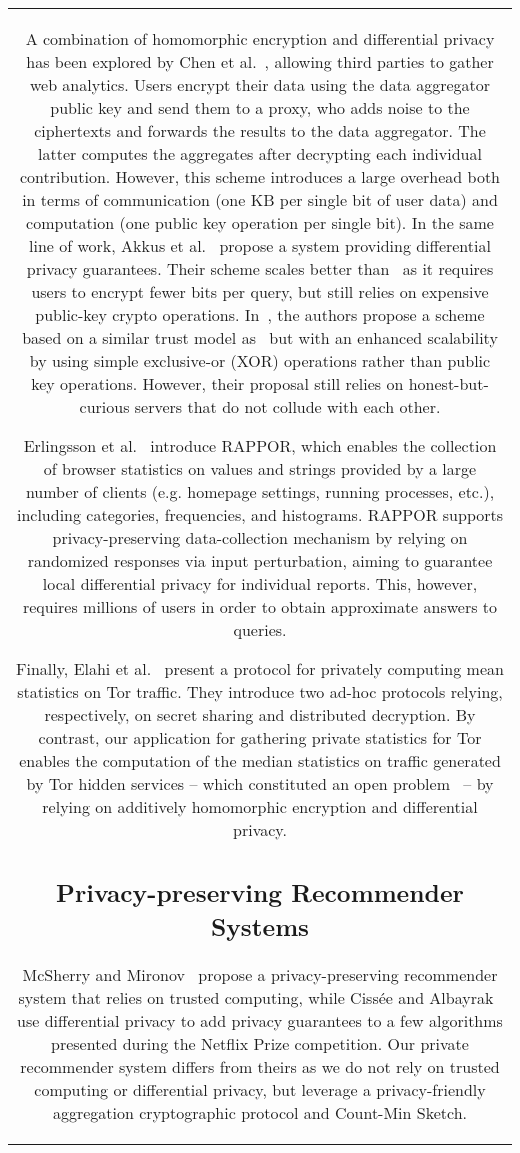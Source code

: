 \documentclass[conference]{IEEEtran}
\begin{document}
\begin{figure*}[ht!]
{\begin{tabular}{|c|}
A combination of homomorphic encryption and differential privacy has  been explored by Chen et al.~\cite{chen2012towards}, allowing third parties to gather web analytics.
Users encrypt their data using the data aggregator public key and send them to a proxy, who adds noise to the ciphertexts and forwards the results to the data aggregator. The latter computes the aggregates after decrypting each individual contribution.
However, this scheme introduces a large overhead both in terms of communication (one KB per single bit of user data) and computation (one public key operation per single bit).
In the same line of work, Akkus et al.~\cite{akkus2012non} propose a system providing differential privacy guarantees. 
Their scheme scales better than~\cite{chen2012towards} as it requires users to encrypt fewer bits per query, but still relies on expensive public-key crypto operations.
In~\cite{chen2013splitx}, the authors propose a scheme based on a similar trust model as~\cite{chen2012towards} but with an enhanced scalability by using simple exclusive-or (XOR) operations rather than public key operations. However, their proposal still relies on honest-but-curious servers that do not collude with each other.







Erlingsson et al.~\cite{erlingsson2014rappor} introduce RAPPOR, which enables the collection of browser statistics on values and strings provided by a large number of clients (e.g. homepage settings, running processes, etc.), including categories, frequencies, and histograms.
RAPPOR supports privacy-preserving data-collection mechanism by relying on randomized responses via input perturbation, aiming to guarantee local differential privacy for  individual reports.
This, however, requires millions of users in order to obtain approximate answers to queries.


Finally, Elahi et al.~\cite{elahi2014privex} present a protocol for privately computing mean statistics on Tor traffic.
They introduce two ad-hoc protocols relying, respectively, on secret sharing and distributed decryption. By contrast, our application for gathering private statistics for Tor enables the computation of the median statistics on traffic generated by Tor hidden services -- which constituted an open problem~\cite{goulethidden} -- by relying on additively homomorphic encryption and differential privacy. 


\subsection{Privacy-preserving Recommender Systems}
McSherry and Mironov~\cite{mcsherry2009differentially} propose a privacy-preserving recommender system that relies on trusted computing, while Ciss{\'e}e and Albayrak~\cite{cissee2007agent} use differential privacy to add privacy guarantees to a few algorithms presented during the Netflix Prize competition.
Our private recommender system differs from theirs as we do not rely on trusted computing or differential privacy, but leverage a privacy-friendly aggregation cryptographic protocol and Count-Min Sketch.



\end{tabular}}
\end{figure*}
\end{document}
